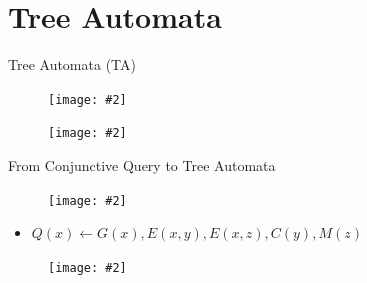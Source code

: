 \documentclass{beamer}
\newcommand{\pic}[2][100]{
	\begin{figure}
		\centering
		\texttt{[image: \#2]}
	\end{figure}
}
\begin{document}
	\section{Tree Automata}
	\begin{frame}{Tree Automata (TA)}
		\pic{pics/treeautomata}
		\pic{pics/taexample}			
	\end{frame}
	\begin{frame}{From Conjunctive Query to Tree Automata}
		\pic{pics/cq2ta}
		\vspace{2ex}
		\begin{itemize}
			\item $Q(x)\leftarrow G(x), E(x, y), E(x, z), C(y), M(z)$
		\end{itemize}	
		\vspace{2ex}
		\pic{pics/anstree}		
	\end{frame}
\end{document}
